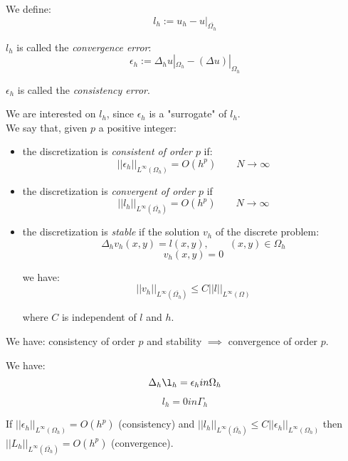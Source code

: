 We define:
\begin{equation*}
l_h := u_h - u|_{\overline{\Omega_h}}
\end{equation*}

$l_h$ is called the \textit{convergence error}:
\begin{equation*}
\epsilon_h := \Delta_h u|_{\Omega_h} - (\Delta u)|_{\Omega_h}
\end{equation*}

$\epsilon_h$ is called the \textit{consistency error}.

We are interested on $l_h$, since $\epsilon_h$ is a "surrogate" of $l_h$.\\


We say that, given $p$ a positive integer:

\begin{itemize}
	\item the discretization is \textit{consistent of order $p$} if:
		\begin{equation*}
		|| \epsilon_h ||_{L^\infty(\Omega_h)} = O(h^p) \qquad N \rightarrow \infty
		\end{equation*}
	\item the discretization is \textit{convergent of order $p$} if
		\begin{equation*}
		|| l_h ||_{L^\infty(\overline{\Omega_h})} = O(h^p) \qquad N \rightarrow \infty
		\end{equation*}
		
	\item the discretization is \textit{stable} if the solution $v_h$ of the discrete problem:
		\begin{equation*}
		\Delta_h v_h(x, y) = l(x,y), \qquad (x, y) \in \Omega_h
		\end{equation*}
		\begin{equation*}
		v_h(x, y) = 0
		\end{equation*}
	
		we have:
		\begin{equation*}
		|| v_h ||_{L^\infty(\overline{\Omega_h})} \le C || l ||_{L^\infty(\Omega)}
		\end{equation*}
		
		where $C$ is independent of $l$ and $h$.
\end{itemize}

We have: consistency of order $p$ and stability $\implies$ convergence of order $p$.

We have:
\begin{equation*}
\Delta_h \l_h = \epsilon_h in \Omega_h
\end{equation*}

\begin{equation*}
l_h = 0 in \Gamma_h
\end{equation*}

If $||\epsilon_h||_{L^\infty(\Omega_h)} = O(h^p)$ (consistency) and $||l_h||_{L^\infty(\overline{\Omega_h})} \le C || \epsilon_h ||_{L^\infty(\Omega_h)}$ then $||L_h||_{L^\infty(\overline{\Omega_h})} = O(h^p)$ (convergence).

